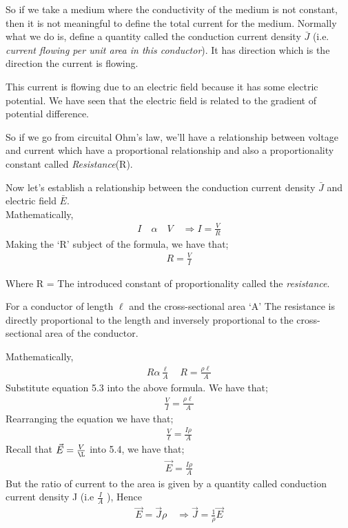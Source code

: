 So if we take a medium where the conductivity of the medium is not constant, then it is not meaningful to define the total current for the medium. Normally what we do is, define a quantity called the conduction current density $ \bar{J} $ (i.e. \emph{current flowing per unit area in this conductor}). It has direction which is the direction the current is flowing. 

This current is flowing due to an electric field because it has some electric potential. We have seen that the electric field is related to the gradient of potential difference.

So if we go from circuital Ohm's law, we'll have a relationship between voltage and current which have a proportional relationship and also a proportionality constant called \emph{Resistance}(R).

Now let's establish a relationship between the conduction current density $ \bar{J} $ and electric field $ \bar{E} $. \\
Mathematically, 
\begin{align*}
	I\quad\alpha\quad V \quad\Rightarrow I = \frac{V}{R}
\end{align*} 
Making the `R' subject of the formula, we have that; 
\begin{align}
	R = \frac{V}{I} 
\end{align}
\begin{center}
	Where R = The introduced constant of proportionality called the \textit{resistance}.
\end{center}
For a conductor of length $\ell$ and the cross-sectional area `A' The resistance is directly proportional to the length and inversely proportional to the cross-sectional area of the conductor.

Mathematically, 
\begin{align*}
	R \alpha \frac{\ell}{A}\quad R = \frac{\rho\ell}{A}
\end{align*}
Substitute equation 5.3 into the above formula. We have that;
\begin{align*}
	\frac{V}{I} = \frac{\rho\ell}{A}
\end{align*}
Rearranging the equation we have that; 
\begin{align}
	\frac{V}{\ell} = \frac{I\rho}{A}
\end{align}
Recall that $\vec{E} = \frac{V}{\L}$ into 5.4, we have that;
\begin{align*}
	\vec{E} = \frac{I\rho}{A}
\end{align*}
But the ratio of current to the area is given by a quantity called conduction current density J (i.e $ \frac{I}{A} $ ), Hence
\begin{align*}
	\vec{E} = \vec{J}\rho \quad \Rightarrow \vec{J}=\frac{1}{\rho}\vec{E}
\end{align*}

